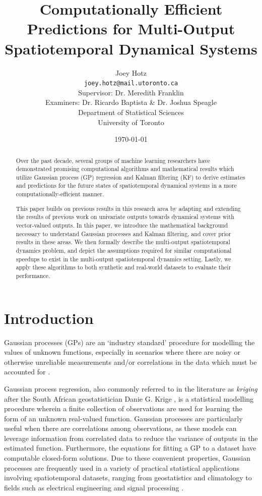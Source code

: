 \documentclass[10pt]{article}
\title{\textbf{Computationally Efficient Predictions for Multi-Output Spatiotemporal Dynamical Systems}} %
\author{
    Joey Hotz \\ \vspace{-0.3cm}\normalsize\texttt{joey.hotz@mail.utoronto.ca}\\ %
    \large
    \vspace{0.5cm}
    Supervisor: Dr. Meredith Franklin \\ %

    Examiners: Dr. Ricardo Baptista \& Dr. Joshua Speagle

    \vspace{0.5cm}
    Department of Statistical Sciences \\
    University of Toronto
}
\date{\today}
\begin{document}
\maketitle
\thispagestyle{empty}

\begin{abstract}
    Over the past decade, several groups of machine learning researchers have demonstrated promising computational algorithms and mathematical results which utilize Gaussian process (GP) regression and Kalman filtering (KF) to derive estimates and predictions for the future states of spatiotemporal dynamical systems in a more computationally-efficient manner.
    
    This paper builds on previous results in this research area by adapting and extending the results of previous work on univariate outputs towards dynamical systems with vector-valued outputs. In this paper, we introduce the mathematical background necessary to understand Gaussian processes and Kalman filtering, and cover prior results in these areas. We then formally describe the multi-output spatiotemporal dynamics problem, and depict the assumptions required for similar computational speedups to exist in the multi-output spatiotemporal dynamics setting. Lastly, we apply these algorithms to both synthetic and real-world datasets to evaluate their performance.
\end{abstract}

\clearpage

\tableofcontents

\newpage

\setcounter{page}{1}

\section{Introduction}
\label{sec:intro}

Gaussian processes (GPs) are an `industry standard' procedure for modelling the values of unknown functions, especially in scenarios where there are noisy or otherwise unreliable measurements and/or correlations in the data which must be accounted for \citep{GPML-Book-2006}. 

Gaussian process regression, also commonly referred to in the literature as \emph{kriging} after the South African geostatistician Danie G. Krige \citep{Cressie-Origins-1990}, is a statistical modelling procedure wherein a finite collection of observations are used for learning the form of an unknown real-valued function. Gaussian processes are particularly useful when there are correlations among observations, as these models can leverage information from correlated data to reduce the variance of outputs in the estimated function. Furthermore, the equations for fitting a GP to a dataset have computable closed-form solutions. Due to these convenient properties, Gaussian processes are frequently used in a variety of practical statistical applications involving spatiotemporal datasets, ranging from geostatistics and climatology to fields such as electrical engineering and signal processing \citep{Sarkka-Spatial-Kalman-2012,Huang-Nonstationary-2025}.
\end{document}
